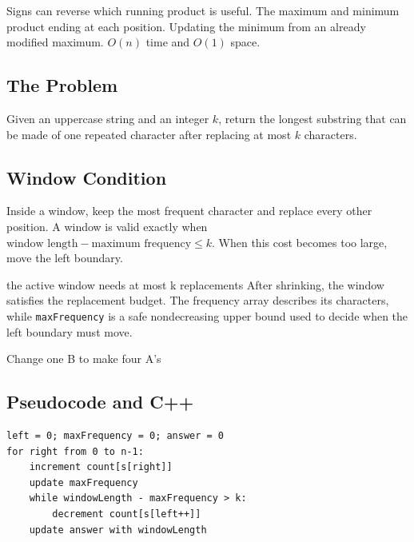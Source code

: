 \chaptercheckpoint
  {Signs can reverse which running product is useful.}
  {The maximum and minimum product ending at each position.}
  {Updating the minimum from an already modified maximum.}
  {$O(n)$ time and $O(1)$ space.}



\subsection{The Problem}
Given an uppercase string and an integer \(k\), return the longest substring
that can be made of one repeated character after replacing at most \(k\)
characters.

\subsection{Window Condition}
Inside a window, keep the most frequent character and replace every other
position. A window is valid exactly when \(\text{window length}-\text{maximum frequency}\le k.\)
When this cost becomes too large, move the left boundary.

\begin{invariantbox}{the active window needs at most k replacements}
After shrinking, the window satisfies the replacement budget. The frequency
array describes its characters, while \texttt{maxFrequency} is a safe
nondecreasing upper bound used to decide when the left boundary must move.
\end{invariantbox}

\begin{visualbox}{Change one B to make four A's}
\centering
{}
\end{visualbox}

\subsection{Pseudocode and C++}
\begin{lstlisting}[style=pseudocode]
left = 0; maxFrequency = 0; answer = 0
for right from 0 to n-1:
    increment count[s[right]]
    update maxFrequency
    while windowLength - maxFrequency > k:
        decrement count[s[left++]]
    update answer with windowLength
\end{lstlisting}

